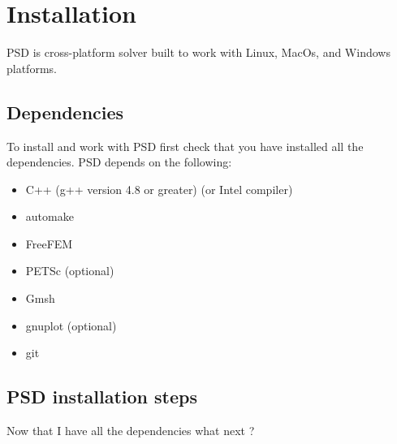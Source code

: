 \chapter{Installation}


PSD is cross-platform solver built to work with Linux, MacOs, and Windows platforms. 

\section{Dependencies}

To install and work with PSD first check that you have installed all the dependencies. PSD depends on the following:   

\begin{itemize}
\item  {\ttfamily C++}    (g++ version 4.8 or greater) (or Intel compiler)
\item  {\ttfamily automake}
\item  {\ttfamily FreeFEM}
\item  {\ttfamily PETSc}      (optional)
\item  {\ttfamily Gmsh}
\item  {\ttfamily gnuplot}	(optional)
\item  {\ttfamily git}   
\end{itemize}


\section{PSD installation steps \label{sec:psd-install}}
Now that I have all the dependencies what next ?  

